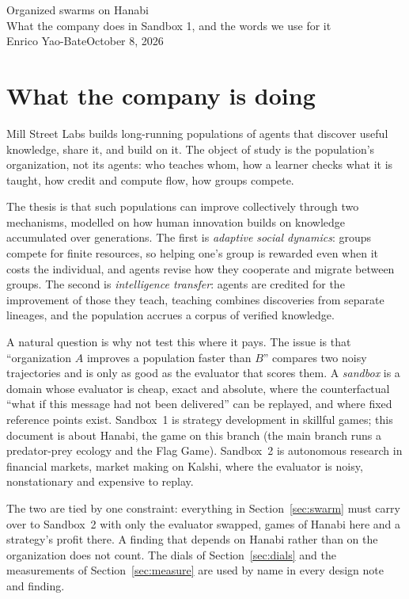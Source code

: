 \documentclass[11pt]{article}
\numberwithin{theorem}{section}
\theoremstyle{definition}
\begin{document}
\begin{center}
{\LARGE Organized swarms on Hanabi}\\[5pt]
{\large What the company does in Sandbox 1, and the words we use for it}\\[7pt]
Enrico Yao-Bate\qquad October 8, 2026
\end{center}

\section{What the company is doing}

Mill Street Labs builds long-running populations of agents that discover useful knowledge, share it, and build on it.
The object of study is the population's organization, not its agents: who teaches whom, how a learner checks what
it is taught, how credit and compute flow, how groups compete.

The thesis is that such populations can improve collectively through two mechanisms, modelled on how human
innovation builds on knowledge accumulated over generations. The first is \emph{adaptive social dynamics}: groups
compete for finite resources, so helping one's group is rewarded even when it costs the individual, and agents revise
how they cooperate and migrate between groups. The second is \emph{intelligence transfer}: agents are credited for the
improvement of those they teach, teaching combines discoveries from separate lineages, and the population accrues a
corpus of verified knowledge.

A natural question is why not test this where it pays. The issue is that ``organization $A$ improves a population
faster than $B$'' compares two noisy trajectories and is only as good as the evaluator that scores them. A
\emph{sandbox} is a domain whose evaluator is cheap, exact and absolute, where the counterfactual ``what if this message
had not been delivered'' can be replayed, and where fixed reference points exist. Sandbox~1 is strategy development in
skillful games; this document is about Hanabi, the game on this branch (the main branch runs a predator-prey ecology
and the Flag Game). Sandbox~2 is autonomous research in financial markets, market making on Kalshi, where the evaluator
is noisy, nonstationary and expensive to replay.

The two are tied by one constraint: everything in Section~\ref{sec:swarm} must carry over to Sandbox~2 with only the
evaluator swapped, games of Hanabi here and a strategy's profit there. A finding that depends on Hanabi rather than on
the organization does not count. The dials of Section~\ref{sec:dials} and the measurements of
Section~\ref{sec:measure} are used by name in every design note and finding.
\end{document}
